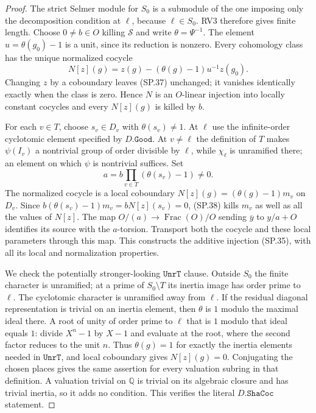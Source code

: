 \begin{proof}
The strict Selmer module for $S_0$ is a submodule of the one imposing
only the decomposition condition at $\ell$, because $\ell\in S_0$.
RV3 therefore gives finite length.  Choose $0\ne b\in O$ killing
$\mathcal S$ and write $\theta=\Psi^{-1}$.
The element $u=\theta(g_0)-1$ is a unit, since its reduction is
nonzero.  Every cohomology class has the unique normalized cocycle
\[
                 N[z](g)=z(g)-(\theta(g)-1)u^{-1}z(g_0).
 \tag{SP.37}
\]
Changing $z$ by a coboundary leaves (SP.37) unchanged; it vanishes
identically exactly when the class is zero.  Hence $N$ is an
$O$-linear injection into locally constant cocycles and every
$N[z](g)$ is killed by $b$.

For each $v\in T$, choose $s_v\in D_v$ with
$\theta(s_v)\ne1$.  At $\ell$ use the infinite-order cyclotomic
element specified by $D.\texttt{Good}$.  At $v\ne\ell$ the
definition of $T$ makes $\psi(I_v)$ a nontrivial group of order
divisible by $\ell$, while $\chi_\ell$ is unramified there; an
element on which $\psi$ is nontrivial suffices.  Set
\[
                       a=b\prod_{v\in T}(\theta(s_v)-1)\ne0.
 \tag{SP.38}
\]
The normalized cocycle is a local coboundary
$N[z](g)=(\theta(g)-1)m_v$ on $D_v$.  Since
$b(\theta(s_v)-1)m_v=bN[z](s_v)=0$, (SP.38) kills $m_v$ as well
as all the values of $N[z]$.
The map $O/(a)\to\operatorname{Frac}(O)/O$ sending
$\overline y$ to $y/a+O$ identifies its source with the $a$-torsion.
Transport both the cocycle and these local parameters through this
map.  This constructs the additive injection (SP.35), with all its
local and normalization properties.

We check the potentially stronger-looking $\texttt{UnrT}$ clause.
Outside $S_0$ the finite character is unramified; at a prime of
$S_0\setminus T$ its inertia image has order prime to $\ell$.
The cyclotomic character is unramified away from $\ell$.
If the residual diagonal representation is trivial on an inertia
element, then $\theta$ is $1$ modulo the maximal ideal there.  A
root of unity of order prime to $\ell$ that is $1$ modulo that ideal
equals $1$: divide $X^n-1$ by $X-1$ and evaluate at the root, where
the second factor reduces to the unit $n$.
Thus $\theta(g)=1$ for exactly the inertia elements needed in
$\texttt{UnrT}$, and local coboundary gives $N[z](g)=0$.
Conjugating the chosen places gives the same assertion for every
valuation subring in that definition.  A valuation trivial on
$\mathbb Q$ is trivial on its algebraic closure and has trivial
inertia, so it adds no condition.  This verifies the literal
$D.\texttt{ShaCoc}$ statement.


\end{proof}
